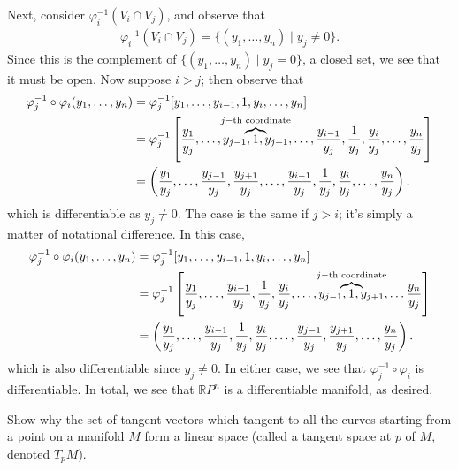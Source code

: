 \documentclass[12pt,letterpaper,boxed]{math_hw_pset}
\newcommand{\rr}{\mathbb{R}}
\renewcommand{\phi}{\varphi}
\begin{document}
\begin{solution}
\[    \] 
    Next, consider $\phi_i^{-1}(V_i \cap V_j)$, and observe that 
    \begin{align*}
        \phi_i^{-1}(V_i \cap V_j)
        =
        \{(y_1, \dots, y_n) \mid y_j \ne 0\}.
    \end{align*}
    Since this is the complement of $\{(y_1, \dots, y_n) \mid y_j = 0\}$, 
    a closed set, we see that it must be open. Now suppose $i > j$; then 
    observe that 
    \begin{align*}
        \phi_j^{-1}\circ \phi_i(y_1, \dots, y_n)
        &=
        \phi_j^{-1}[y_1, \dots, y_{i-1}, 1, y_i, \dots, y_n]\\
        &=
        \phi_j^{-1}\left[ \frac{y_1}{y_j}, \dots, y_{j-1}, \hspace{-0.9cm} \overbrace{1}^{j-\text{th coordinate}}\hspace{-0.9cm}, y_{j+1}, \dots,\frac{y_{i-1}}{y_j}, \frac{1}{y_j}, \frac{y_i}{y_j}, \dots, \frac{y_n}{y_j} \right]\\
        &= 
        \left( \frac{y_1}{y_j}, \dots, \frac{y_{j-1}}{y_j}, \frac{y_{j+1}}{y_j}, \dots,  \frac{y_{i-1}}{y_j}, \frac{1}{y_j}, \frac{y_i}{y_j}, \dots, \frac{y_n}{y_j} \right).
    \end{align*}
    which is differentiable as $y_j \ne 0$.
    The case is the same if $j > i$; it's simply a matter of notational difference. 
    In this case, 
    \begin{align*}
        \phi_j^{-1}\circ \phi_i(y_1, \dots, y_n)
        &=
        \phi_j^{-1}[y_1, \dots, y_{i-1}, 1, y_i, \dots, y_n]\\
        &=
        \phi_j^{-1}\left[ \frac{y_1}{y_j}, \dots,\frac{y_{i-1}}{y_j}, \frac{1}{y_j}, \frac{y_i}{y_j}, \dots, y_{j-1}, \hspace{-0.9cm} \overbrace{1}^{j-\text{th coordinate}}\hspace{-0.9cm}, y_{j+1}, \dots \frac{y_n}{y_j} \right]\\
        &= 
        \left( \frac{y_1}{y_j}, \dots,  \frac{y_{i-1}}{y_j}, \frac{1}{y_j}, \frac{y_i}{y_j}, \dots, \frac{y_{j-1}}{y_j}, \frac{y_{j+1}}{y_j}, \dots, \frac{y_n}{y_j} \right).
    \end{align*}
    which is also differentiable since $y_j \ne 0$. In either case, we 
    see that $\phi_j^{-1}\circ \phi_i$ is differentiable. In total, 
    we see that $\rr P^n$ is a differentiable manifold, as desired. 
\end{solution}

\begin{exercise}[Problem 2.]
    Show why the set of tangent vectors which tangent to all the curves starting from a point on 
    a manifold $M$ form a linear space (called a tangent space at $p$ of $M$, denoted $T_p M$). 
\end{exercise}
\end{document}
